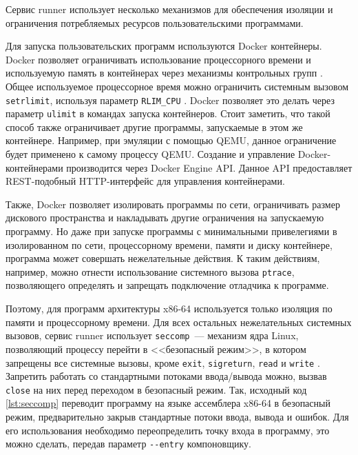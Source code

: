 \documentclass[a4paper,article,14pt]{extarticle}
\begin{document}
Сервис runner использует несколько механизмов для обеспечения изоляции и ограничения потребляемых ресурсов пользовательскими программами.

Для запуска пользовательских программ используются Docker контейнеры. Docker позволяет ограничивать использование процессорного времени и используемую память в контейнерах через механизмы контрольных групп \cite{dockerlimits}. Общее используемое процессорное время можно ограничить системным вызовом \texttt{setrlimit}, используя параметр \texttt{RLIM\_CPU} \cite{setrlimit}. Docker позволяет это делать через параметр \texttt{ulimit} в командах запуска контейнеров. Стоит заметить, что такой способ также ограничивает другие программы, запускаемые в этом же контейнере. Например, при эмуляции с помощью QEMU, данное ограничение будет применено к самому процессу QEMU. Создание и управление Docker-контейнерами производится через Docker Engine API. Данное API предоставляет REST-подобный HTTP-интерфейс для управления контейнерами.

Также, Docker позволяет изолировать программы по сети, ограничивать размер дискового пространства и накладывать другие ограничения на запускаемую программу. Но даже при запуске программы с минимальными привелегиями в изолированном по сети, процессорному времени, памяти и диску контейнере, программа может совершать нежелательные действия. К таким действиям, например, можно отнести использование системного вызова \texttt{ptrace}, позволяющего определять и запрещать подключение отладчика к программе.

Поэтому, для программ архитектуры x86-64 используется только изоляция по памяти и процессорному времени. Для всех остальных нежелательных системных вызовов, сервис runner использует \texttt{seccomp}~--- механизм ядра Linux, позволяющий процессу перейти в <<безопасный режим>>, в котором запрещены все системные вызовы, кроме \texttt{exit}, \texttt{sigreturn}, \texttt{read} и \texttt{write} \cite{seccomp}. Запретить работать со стандартными потоками ввода/вывода можно, вызвав \texttt{close} на них перед переходом в безопасный режим. Так, исходный код \ref{lst:seccomp} переводит программу на языке ассемблера x86-64 в безопасный режим, предварительно закрыв стандартные потоки ввода, вывода и ошибок. Для его использования необходимо переопределить точку входа в программу, это можно сделать, передав параметр \texttt{-{}-entry} компоновщику.
\end{document}
